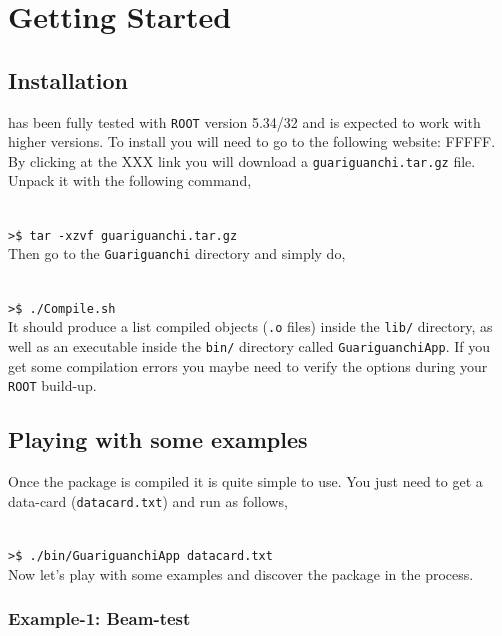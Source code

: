 \section{Getting Started}
\label{sec:Getting_started}

\subsection{Installation}

{\guari} has been fully tested with {\tt ROOT} version 5.34/32 and is expected to work with higher versions. To install {\guari} 
you will need to go to the following website: FFFFF. By clicking at the XXX link you will download a {\tt guariguanchi.tar.gz} file. 
Unpack it with the following command,

~\\
\noindent
{\tt >\$ tar -xzvf guariguanchi.tar.gz}
~\\

\noindent
Then go to the {\tt Guariguanchi} directory and simply do,

~\\
\noindent
{\tt >\$ ./Compile.sh}
~\\

\noindent
It should produce a list compiled objects ({\tt .o} files) inside the {\tt lib/} directory, as well as an executable inside the {\tt bin/} 
directory called {\tt GuariguanchiApp}. If you get some compilation errors you maybe need to verify the options during your {\tt ROOT} build-up. 


\subsection{Playing with some examples}
\label{subsec:Some_examples}

Once the package is compiled it is quite simple to use. You just need to get a data-card ({\tt datacard.txt}) and run {\guari} as 
follows,

~\\
\noindent
{\tt >\$ ./bin/GuariguanchiApp  datacard.txt}
~\\

\noindent
Now let's play with some examples and discover the package in the process.

\subsubsection{Example-1: Beam-test}
\label{subsubsec:Example1}

